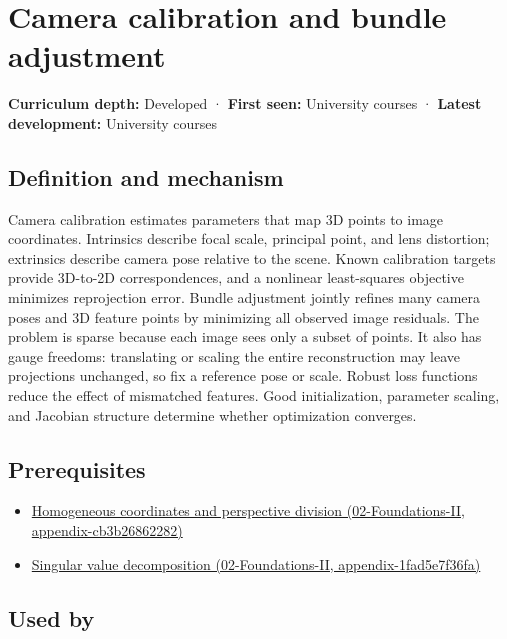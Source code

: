 \hypertarget{appendix-3ee9861904d5}{}
\section{Camera calibration and bundle adjustment}\label{appendix-3ee9861904d5-camera-calibration-and-bundle-adjustment}

\textbf{Curriculum depth:} Developed · \textbf{First seen:} University courses · \textbf{Latest development:} University courses

\subsection{Definition and mechanism}\label{appendix-3ee9861904d5-definition-and-mechanism}

Camera calibration estimates parameters that map 3D points to image coordinates. Intrinsics describe focal scale, principal point, and lens distortion; extrinsics describe camera pose relative to the scene. Known calibration targets provide 3D-to-2D correspondences, and a nonlinear least-squares objective minimizes reprojection error. Bundle adjustment jointly refines many camera poses and 3D feature points by minimizing all observed image residuals. The problem is sparse because each image sees only a subset of points. It also has gauge freedoms: translating or scaling the entire reconstruction may leave projections unchanged, so fix a reference pose or scale. Robust loss functions reduce the effect of mismatched features. Good initialization, parameter scaling, and Jacobian structure determine whether optimization converges.

\subsection{Prerequisites}\label{appendix-3ee9861904d5-prerequisites}

\begin{itemize}
\tightlist
\item
  \href{../02-Foundations-II/main.pdf\#nameddest=appendix-cb3b26862282}{Homogeneous coordinates and perspective division (02-Foundations-II, appendix-cb3b26862282)}
\item
  \href{../02-Foundations-II/main.pdf\#nameddest=appendix-1fad5e7f36fa}{Singular value decomposition (02-Foundations-II, appendix-1fad5e7f36fa)}
\end{itemize}

\subsection{Used by}\label{appendix-3ee9861904d5-used-by}

